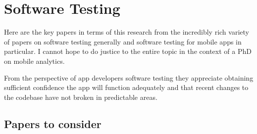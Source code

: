 \section{Software Testing}
Here are the key papers in terms of this research from the incredibly rich variety of papers on software testing generally and software testing for mobile apps in particular. I cannot hope to do justice to the entire topic in the context of a PhD on mobile analytics.

From the perspective of app developers software testing they appreciate obtaining sufficient confidence the app will function adequately and that recent changes to the codebase have not broken in predictable areas. 


\subsection{Papers to consider}

